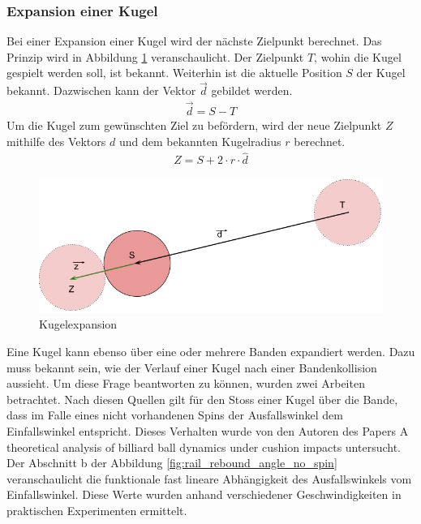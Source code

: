 \subsubsection{Expansion einer Kugel}
Bei einer Expansion einer Kugel wird der nächste Zielpunkt berechnet. Das Prinzip wird in Abbildung \ref{fig:kugelexpansion}
veranschaulicht.
Der Zielpunkt $T$, wohin die Kugel gespielt werden soll, ist bekannt.
Weiterhin ist die aktuelle Position $S$ der Kugel bekannt. Dazwischen kann der Vektor $\vec{d}$ gebildet werden.
\begin{align}
    \vec{d} = S - T
\end{align}
Um die Kugel zum gewünschten Ziel zu befördern, wird der neue Zielpunkt $Z$ mithilfe des Vektors $d$ und dem bekannten
Kugelradius $r$ berechnet.
\begin{align}
    Z = S + 2 \cdot r \cdot \hat{d}
\end{align}

\begin{figure}[h!]
    \begin{center}
        \includegraphics[width=0.5\linewidth]{../common/03_billiard_ai/resources/35_suchkandidat_kugel_expand.png}
    \end{center}
    \caption{Kugelexpansion}
    \label{fig:kugelexpansion}
\end{figure}

\label{kandidatensuche:bandenkollisionstheorie}
Eine Kugel kann ebenso über eine oder mehrere Banden expandiert werden. Dazu muss bekannt sein, wie der Verlauf einer
Kugel nach einer Bandenkollision aussieht. Um diese Frage beantworten zu können, wurden zwei Arbeiten betrachtet.
Nach diesen Quellen gilt für den Stoss einer Kugel über die Bande, dass im Falle eines nicht vorhandenen Spins
der Ausfallswinkel dem Einfallswinkel entspricht. Dieses Verhalten wurde von den Autoren des Papers \glqq A theoretical analysis of billiard ball dynamics under cushion impacts\grqq{}
untersucht\cite{10.1243/09544062JMES1964}. Der Abschnitt \glqq b\grqq{} der Abbildung \ref{fig:rail_rebound_angle_no_spin} veranschaulicht die
funktionale fast lineare Abhängigkeit des Ausfallswinkels vom Einfallswinkel. Diese Werte wurden anhand verschiedener
Geschwindigkeiten in praktischen Experimenten ermittelt\cite{10.1243/09544062JMES1964}.

